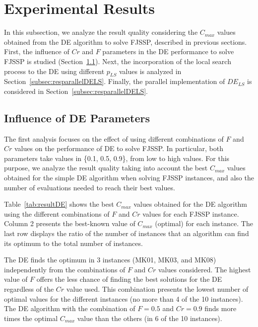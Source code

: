 

\section{Experimental Results}

In this subsection, we analyze the result quality considering the $C_{max}$ values obtained from the DE algorithm to solve FJSSP, described in previous sections. First, the influence of $Cr$ and $F$ parameters in the DE performance to solve FJSSP is studied (Section~\ref{subsec:Parameters}). Next, the incorporation of the local search process to the DE using different $p_{LS}$ values is analyzed in Section~\ref{subsec:resparallelDELS}. Finally, the parallel implementation of $DE_{LS}$ is considered in Section~\ref{subsec:resparallelDELS}. 

\subsection{Influence of DE Parameters} \label{subsec:Parameters}

The first analysis focuses on the effect of using different combinations of $F$ and $Cr$ values on the performance of DE to solve FJSSP. In particular, both parameters take values in \{0.1, 0.5, 0.9\}, from low to high values. For this purpose, we analyze the result quality taking into account the best $C_{max}$ values obtained for the simple DE algorithm when solving FJSSP instances, and also the number of evaluations needed to reach their best values.

Table~\ref{tab:resultDE} shows the best $C_{max}$ values obtained for the DE algorithm using the different combinations of $F$ and $Cr$ values for each FJSSP instance. Column 2 presents the best-known value of $C_{max}$ (optimal) for each instance. The last row displays the ratio of the number of instances that an algorithm can find its optimum to the total number of instances. 

The DE finds the optimum in 3 instances (MK01, MK03, and MK08) independently from the combinations of $F$ and $Cr$ values considered. The highest value of $F$ offers the less chance of finding the best solutions for the DE regardless of the $Cr$ value used. This combination presents the lowest number of optimal values for the different instances (no more than 4 of the 10 instances). The DE algorithm with the combination of $F=0.5$ and $Cr=0.9$ finds more times the optimal $C_{max}$ value than the others (in 6 of the 10 instances).

